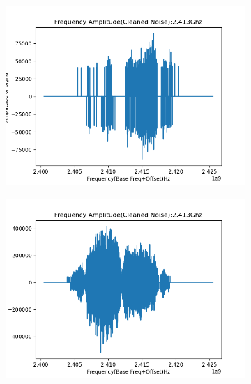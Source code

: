 \begin{itemize}
\begin{figure}[H]
      \begin{subfigure}{0.5\textwidth}
        \includegraphics[width=0.9\linewidth]{ images/nondrone_2.413Ghz-FA-19.00.png }
        \label{fig:subim3}
      \end{subfigure}
      \begin{subfigure}{0.5\textwidth}
        \includegraphics[width=0.9\linewidth]{ images/nondrone_2.443Ghz-FA-19.00.png }
        \label{fig:subim4}
      \end{subfigure}


\end{figure}
\end{itemize}
